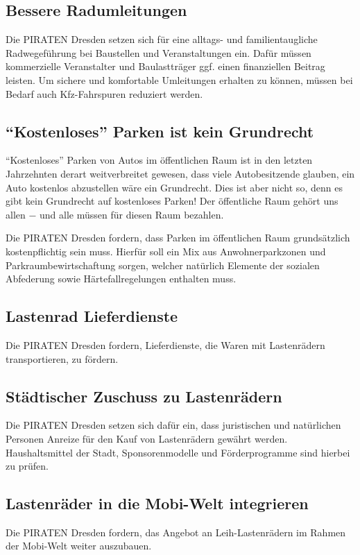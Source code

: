 \documentclass[a4paper, 11pt]{article}
\begin{document}
\subsection{Bessere Radumleitungen}
Die PIRATEN Dresden setzen sich für eine alltags- und familientaugliche Radwegeführung bei Baustellen und Veranstaltungen ein. Dafür müssen kommerzielle Veranstalter und Baulastträger ggf. einen finanziellen Beitrag leisten. Um sichere und komfortable Umleitungen erhalten zu können, müssen bei Bedarf auch Kfz-Fahrspuren reduziert werden.


\subsection{``Kostenloses'' Parken ist kein Grundrecht}
``Kostenloses'' Parken von Autos im öffentlichen Raum ist in den letzten Jahrzehnten derart weitverbreitet gewesen, dass viele Autobesitzende glauben, ein Auto kostenlos abzustellen wäre ein Grundrecht. Dies ist aber nicht so, denn es gibt kein Grundrecht auf kostenloses Parken! Der öffentliche Raum gehört uns allen $-$ und alle müssen für diesen Raum bezahlen.

Die PIRATEN Dresden fordern, dass Parken im öffentlichen Raum grundsätzlich kostenpflichtig sein muss. Hierfür soll ein Mix aus Anwohnerparkzonen und Parkraumbewirtschaftung sorgen, welcher natürlich Elemente der sozialen Abfederung sowie Härtefallregelungen enthalten muss.


\subsection{Lastenrad Lieferdienste}
Die PIRATEN Dresden fordern, Lieferdienste, die Waren mit Lastenrädern transportieren, zu fördern.


\subsection{Städtischer Zuschuss zu Lastenrädern}
Die PIRATEN Dresden setzen sich dafür ein, dass juristischen und natürlichen Personen Anreize für den Kauf von Lastenrädern gewährt werden. Haushaltsmittel der Stadt, Sponsorenmodelle und Förderprogramme sind hierbei zu prüfen.


\subsection{Lastenräder in die Mobi-Welt integrieren}
Die PIRATEN Dresden fordern, das Angebot an Leih-Lastenrädern im Rahmen der Mobi-Welt weiter auszubauen.
\end{document}
